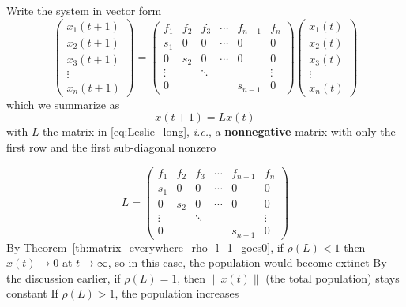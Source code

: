 \documentclass{beamer}
\def\ie{\emph{i.e.}}
\def\defword#1{\textbf{#1}}
\begin{document}
\begin{frame}
Write the system in vector form
\begin{equation}\label{eq:Leslie_long}
\begin{pmatrix}
x_1(t+1) \\ x_2(t+1) \\ x_3(t+1) \\ \vdots \\ x_n(t+1)
\end{pmatrix}
=
\begin{pmatrix}
f_1 & f_2 & f_3 & \cdots & f_{n-1} & f_n \\
s_1 & 0 & 0 & \cdots & 0 & 0 \\
0 & s_2 & 0 & \cdots & 0 & 0 \\
\vdots && \ddots &&& \vdots \\
0 &&&&s_{n-1} & 0
\end{pmatrix}
\begin{pmatrix}
x_1(t) \\ x_2(t) \\ x_3(t) \\ \vdots \\ x_n(t)
\end{pmatrix}
\end{equation}
which we summarize as
\begin{equation}\label{eq:Leslie_short}
x(t+1)=Lx(t)
\end{equation}
with $L$ the matrix in \eqref{eq:Leslie_long}, \ie, a \defword{nonnegative} matrix with only the first row and the first sub-diagonal nonzero
\end{frame}


\begin{frame}
\[
L= \begin{pmatrix}
f_1 & f_2 & f_3 & \cdots & f_{n-1} & f_n \\
s_1 & 0 & 0 & \cdots & 0 & 0 \\
0 & s_2 & 0 & \cdots & 0 & 0 \\
\vdots && \ddots &&& \vdots \\
0 &&&&s_{n-1} & 0
\end{pmatrix}
\]
\vfill
By Theorem~\ref{th:matrix_everywhere_rho_l_1_goes0}, if $\rho(L)<1$ then $x(t)\to 0$ at $t\to\infty$, so in this case, the population would become extinct
\vfill
By the discussion earlier, if $\rho(L)=1$, then $\|x(t)\|$ (the total population) stays constant
\vfill
If $\rho(L)>1$, the population increases
\end{frame}

\end{document}
